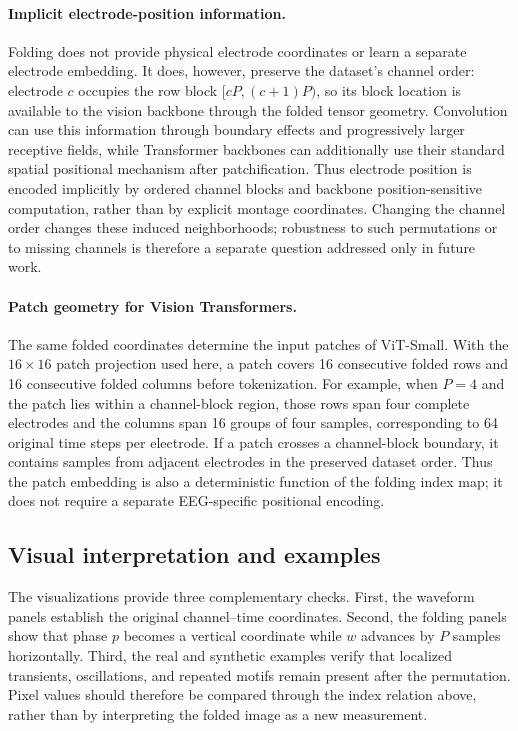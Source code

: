 \paragraph{Implicit electrode-position information.}
Folding does not provide physical electrode coordinates or learn a separate
electrode embedding. It does, however, preserve the dataset's channel order:
electrode $c$ occupies the row block $[cP,(c+1)P)$, so its block location is
available to the vision backbone through the folded tensor geometry. Convolution
can use this information through boundary effects and progressively larger
receptive fields, while Transformer backbones can additionally use their
standard spatial positional mechanism after patchification. Thus electrode
position is encoded implicitly by ordered channel blocks and backbone
position-sensitive computation, rather than by explicit montage coordinates.
Changing the channel order changes these induced neighborhoods; robustness to
such permutations or to missing channels is therefore a separate question
addressed only in future work.

\paragraph{Patch geometry for Vision Transformers.}
The same folded coordinates determine the input patches of ViT-Small. With
the $16\times16$ patch projection used here, a patch covers 16 consecutive
folded rows and 16 consecutive folded columns before tokenization. For example,
when $P=4$ and the patch lies within a channel-block region, those rows span
four complete electrodes and the columns span 16 groups of four samples,
corresponding to 64 original time steps per electrode. If a patch crosses a
channel-block boundary, it contains samples from adjacent electrodes in the
preserved dataset order. Thus the patch embedding is also a deterministic
function of the folding index map; it does not require a separate EEG-specific
positional encoding.

\subsection{Visual interpretation and examples}
\label{app:folding-visuals}

The visualizations provide three complementary checks. First, the waveform
panels establish the original channel--time coordinates. Second, the folding
panels show that phase $p$ becomes a vertical coordinate while $w$ advances
by $P$ samples horizontally. Third, the real and synthetic examples verify
that localized transients, oscillations, and repeated motifs remain present
after the permutation. Pixel values should therefore be compared through the
index relation above, rather than by interpreting the folded image as a new
measurement.

